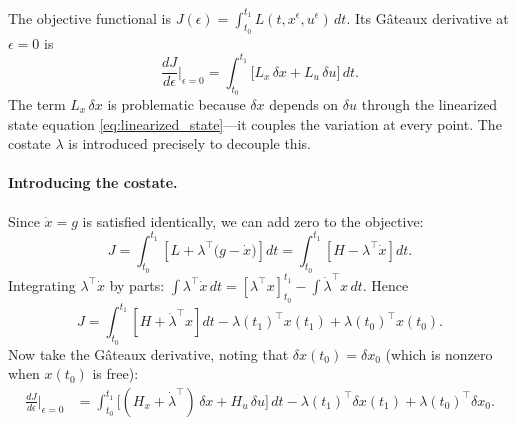 \documentclass[12pt,a4paper]{article}
\theoremstyle{definition}
\theoremstyle{plain}
\theoremstyle{remark}
\begin{document}
The objective functional is $J(\epsilon) = \int_{t_0}^{t_1} L(t, x^\epsilon, u^\epsilon)\, dt$. Its Gâteaux derivative at $\epsilon = 0$ is
\begin{equation}
\label{eq:gateaux_J}
  \frac{dJ}{d\epsilon}\bigg|_{\epsilon=0} = \int_{t_0}^{t_1} \bigl[L_x\, \delta x + L_u\, \delta u\bigr]\, dt.
\end{equation}
The term $L_x\,\delta x$ is problematic because $\delta x$ depends on $\delta u$ through the linearized state equation \eqref{eq:linearized_state}---it couples the variation at every point. The costate $\lambda$ is introduced precisely to decouple this.

\paragraph{Introducing the costate.}
Since $\dot{x} = g$ is satisfied identically, we can add zero to the objective:
\[
  J = \int_{t_0}^{t_1} \left[L + \lambda^\top\!\bigl(g - \dot{x}\bigr)\right] dt
  = \int_{t_0}^{t_1} \left[H - \lambda^\top \dot{x}\right] dt.
\]
Integrating $\lambda^\top \dot{x}$ by parts: $\int \lambda^\top \dot{x}\, dt = [\lambda^\top x]_{t_0}^{t_1} - \int \dot{\lambda}^\top x\, dt$. Hence
\[
  J = \int_{t_0}^{t_1} \left[H + \dot{\lambda}^\top x\right] dt - \lambda(t_1)^\top x(t_1) + \lambda(t_0)^\top x(t_0).
\]
Now take the Gâteaux derivative, noting that $\delta x(t_0) = \delta x_0$ (which is nonzero when $x(t_0)$ is free):
\begin{align}
  \frac{dJ}{d\epsilon}\bigg|_{\epsilon=0}
  &= \int_{t_0}^{t_1} \bigl[(H_x + \dot{\lambda}^\top)\,\delta x + H_u\,\delta u\bigr]\, dt - \lambda(t_1)^\top \delta x(t_1) + \lambda(t_0)^\top \delta x_0.
  \label{eq:gateaux_augmented}
\end{align}
\end{document}
